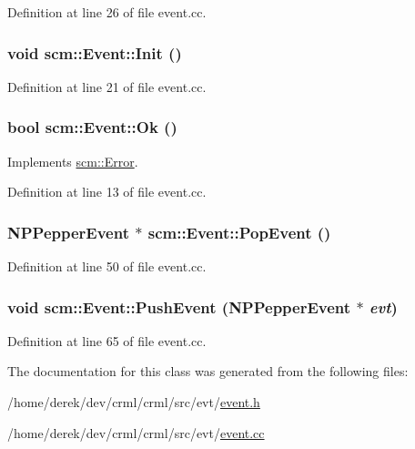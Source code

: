 Definition at line 26 of file event.cc.

\hypertarget{classscm_1_1_event_a2dfdf12d5b7918b2102e7ce1c4142ed3}{
\subsubsection[{Init}]{\setlength{\rightskip}{0pt plus 5cm}void scm::Event::Init ()}}
\label{classscm_1_1_event_a2dfdf12d5b7918b2102e7ce1c4142ed3}


Definition at line 21 of file event.cc.

\hypertarget{classscm_1_1_event_a95400a0d0218dfb664c028d1130a5d14}{
\subsubsection[{Ok}]{\setlength{\rightskip}{0pt plus 5cm}bool scm::Event::Ok ()}}
\label{classscm_1_1_event_a95400a0d0218dfb664c028d1130a5d14}


Implements \hyperlink{classscm_1_1_error_a2660b73f9671be3f286bed9d622a926a}{scm::Error}.



Definition at line 13 of file event.cc.

\hypertarget{classscm_1_1_event_aaa7905956b3d789fa16cc7a73490dc5e}{
\subsubsection[{PopEvent}]{\setlength{\rightskip}{0pt plus 5cm}NPPepperEvent $\ast$ scm::Event::PopEvent ()}}
\label{classscm_1_1_event_aaa7905956b3d789fa16cc7a73490dc5e}


Definition at line 50 of file event.cc.

\hypertarget{classscm_1_1_event_a1e1aa9fbe9b5e7e7c9b0ff8f0ba74cd2}{
\subsubsection[{PushEvent}]{\setlength{\rightskip}{0pt plus 5cm}void scm::Event::PushEvent (NPPepperEvent $\ast$ {\em evt})}}
\label{classscm_1_1_event_a1e1aa9fbe9b5e7e7c9b0ff8f0ba74cd2}


Definition at line 65 of file event.cc.



The documentation for this class was generated from the following files:\begin{DoxyCompactItemize}
\item 
/home/derek/dev/crml/crml/src/evt/\hyperlink{event_8h}{event.h}\item 
/home/derek/dev/crml/crml/src/evt/\hyperlink{event_8cc}{event.cc}\end{DoxyCompactItemize}
